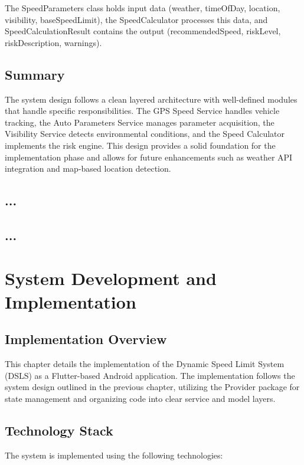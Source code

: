 The SpeedParameters class holds input data (weather, timeOfDay, location, visibility, baseSpeedLimit), the SpeedCalculator processes this data, and SpeedCalculationResult contains the output (recommendedSpeed, riskLevel, riskDescription, warnings).

\section{Summary}
The system design follows a clean layered architecture with well-defined modules that handle specific responsibilities. The GPS Speed Service handles vehicle tracking, the Auto Parameters Service manages parameter acquisition, the Visibility Service detects environmental conditions, and the Speed Calculator implements the risk engine. This design provides a solid foundation for the implementation phase and allows for future enhancements such as weather API integration and map-based location detection.
\section{...}

\section{...}

\chapter{System Development and Implementation}\label{chapter:System}
\section{Implementation Overview}
This chapter details the implementation of the Dynamic Speed Limit System (DSLS) as a Flutter-based Android application. The implementation follows the system design outlined in the previous chapter, utilizing the Provider package for state management and organizing code into clear service and model layers.

\section{Technology Stack}
The system is implemented using the following technologies:

